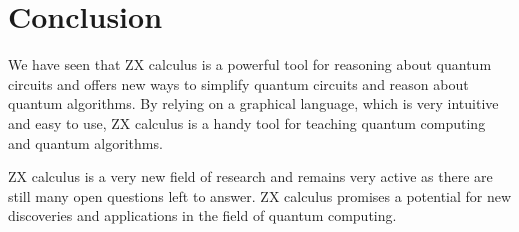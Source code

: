 \section{Conclusion}

We have seen that ZX calculus is a powerful tool for reasoning about quantum circuits and offers new ways to simplify quantum circuits and reason about quantum algorithms.
By relying on a graphical language, which is very intuitive and easy to use,
ZX calculus is a handy tool for teaching quantum computing and quantum algorithms.

ZX calculus is a very new field of research and remains very active as there are still many open questions left to answer. ZX calculus promises a potential for new discoveries and applications in the field of quantum computing.